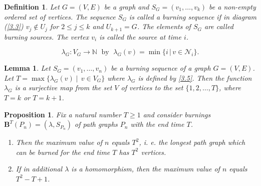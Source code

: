\documentclass[10pt,a4paper]{amsart}
\newtheorem{definition}{Definition}
\newtheorem{lemma}{Lemma}
\newtheorem{proposition}{Proposition}
\begin{document}
\begin{definition}\label{d3.1} \rm Let $G=(V,E)$ be a graph and 
$S_G=(v_1, \dots, v_k)$ be a non-empty ordered  set of vertices. 
 The sequence $S_G$ is called a \emph{burning sequence}  if  in  diagram (\ref{3.3}) $v_j \notin U_j$ for $2\leq j\leq k$ and  $U_{k+1}=G$. 
 The elements of $S_G$ are called \emph{burning sources}. The vertex $v_i$ is called the \emph{source at time $i$}. 
\end{definition}

\begin{equation}\label{3.5} 
\lambda_G\colon V_G\to \mathbb N\;\mbox{ by }\; \lambda_G(v)=\min\{i \,| \, v\in \mathcal N_i\}.
\end{equation}

\begin{lemma}\label{l3.2} Let $S_G=(v_1, \dots, v_n)$ be a burning sequence of a graph $G=(V,E)$.  Let $T=\max\{\lambda_G(v)\;|\;  \, v\in V_G\}$ where $\lambda_G$ is defined by \eqref{3.5}. Then the function $\lambda_G$ is a surjective map from  the set $V$ of vertices to the set  $\{1,2,\dots, T\}$,  
where  $T=k$ or $T=k+1$. 
\end{lemma} 

\begin{proposition}\label{p3.11} Fix a natural number $T\ge 1$ and consider burnings 
$\mathbf B^T(P_n)=(\lambda, S_{P_n})$ of  path graphs $P_n$ with the end time $T$.
\begin{enumerate}[label=$(\roman*)$]

\item  Then the maximum value of $n$  equals  $T^2$, i. e.  the longest path graph which can be burned  for the end time $T$ has $T^2$ vertices.  
\item 
If in additional $\lambda$ is a homomorphism, then  the maximum value of $n$  equals  $T^2-T+1$.
\end{enumerate}
\end{proposition}
\end{document}
